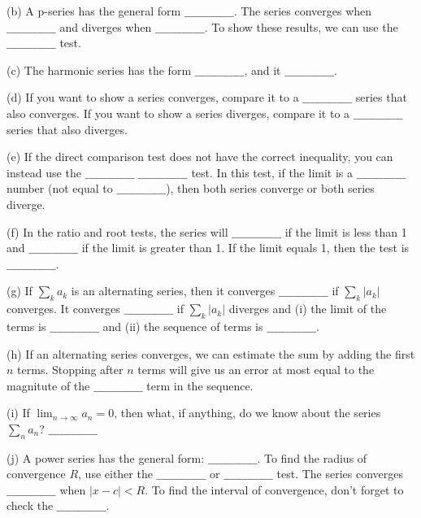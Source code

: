 \documentclass[12pt]{article}
\begin{document}
\medskip
\noindent (b) A p-series has the general form
$\_\_\_\_\_\_\_\_\_\_\_\_\_$.  The series converges when
$\_\_\_\_\_\_\_\_\_\_\_\_\_$ and diverges when
$\_\_\_\_\_\_\_\_\_\_\_\_\_$.  To show these results, we can use the
$\_\_\_\_\_\_\_\_\_\_\_\_\_$ test.

\medskip
\noindent (c) The harmonic series has the form $\_\_\_\_\_\_\_\_\_\_\_\_\_$, and it $\_\_\_\_\_\_\_\_\_\_\_\_\_$. 

\medskip
\noindent (d) If you want to show a series converges, compare it to a 
$\_\_\_\_\_\_\_\_\_\_\_\_\_$ series that also converges.  If you want to 
show a series diverges, compare it to a $\_\_\_\_\_\_\_\_\_\_\_\_\_$ 
series that also diverges.

\medskip
\noindent (e) If the direct comparison test does not have the correct 
inequality, you can instead use the $\_\_\_\_\_\_\_\_\_\_\_\_\_$ 
$\_\_\_\_\_\_\_\_\_\_\_\_\_$ test.  In this test, if the limit is a 
$\_\_\_\_\_\_\_\_\_\_\_\_\_$ number (not equal to 
$\_\_\_\_\_\_\_\_\_\_\_\_\_$), then both series converge or both 
series diverge.

\medskip
\noindent (f)  In the ratio and root tests, the series will 
$\_\_\_\_\_\_\_\_\_\_\_\_\_$ if the limit is less than 1 and 
$\_\_\_\_\_\_\_\_\_\_\_\_\_$ if the limit is greater than 1.  If the limit 
equals 1, then the test is $\_\_\_\_\_\_\_\_\_\_\_\_\_$.

\medskip
\noindent (g) If $\sum_k a_k$ is an alternating series, then it converges $\_\_\_\_\_\_\_\_\_\_\_\_\_$ if $\sum_k |a_k|$ 
converges.  It converges $\_\_\_\_\_\_\_\_\_\_\_\_\_$ if $\sum_k |a_k|$ diverges and (i) the limit of the terms is 
$\_\_\_\_\_\_\_\_\_\_\_\_\_$ and (ii) the sequence of terms is $\_\_\_\_\_\_\_\_\_\_\_\_\_$.

\medskip
\noindent (h) If an alternating series converges, we can estimate the sum 
by adding the first $n$ terms.  Stopping after $n$ terms will give us an 
error at most equal to the magnitute of the $\_\_\_\_\_\_\_\_\_\_\_\_\_$ 
term in the sequence.

\medskip
\noindent (i) If $\lim_{n \to \infty} a_n = 0$, then what, if anything, do 
we know about 
the series $\sum_n a_n$?  $\_\_\_\_\_\_\_\_\_\_\_\_\_$

\medskip
\noindent (j) A power series has the general form: 
$\_\_\_\_\_\_\_\_\_\_\_\_\_$.  To find the radius of convergence $R$, use 
either the  $\_\_\_\_\_\_\_\_\_\_\_\_\_$ or $\_\_\_\_\_\_\_\_\_\_\_\_\_$ 
test.  The series converges $\_\_\_\_\_\_\_\_\_\_\_\_\_$ when $|x-c|<R$.  
To find the interval of convergence, don't forget to check the 
$\_\_\_\_\_\_\_\_\_\_\_\_\_$. 
\end{document}
